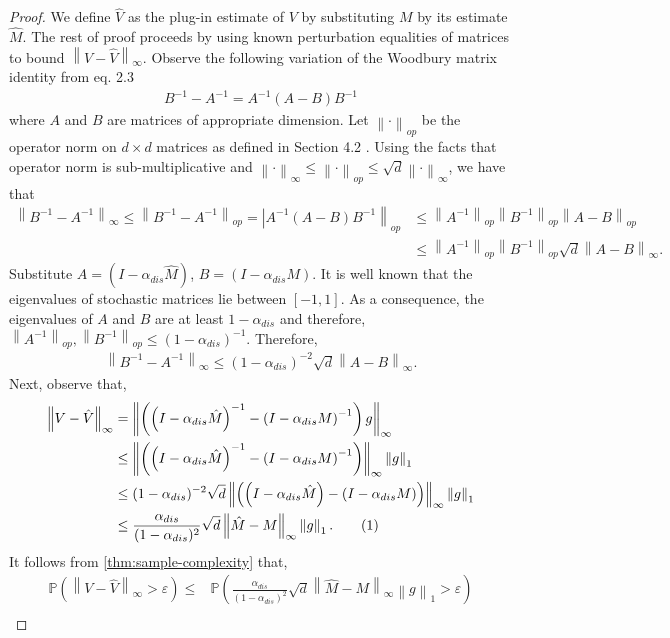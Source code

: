 \documentclass[opre,sglanonrev]{informs4}
\numberwithin{equation}{section}
\newcommand{\lp}{\left(}
\newcommand{\rp}{\right)}
\newcommand{\lv}{\left|}
\newcommand{\lV}{\left\|}
\newcommand{\rV}{\right\|}
\newcommand{\Pbb}{\mathbb{P}}
\newcommand\numberthis{\addtocounter{equation}{1}\tag{\theequation}}
\newcommand{\prob}{\Pbb}
\newcommand{\eps}{\varepsilon}
\begin{document}
\begin{APPENDICES}
\begin{proof}
We define $\hat V$ as the plug-in estimate of $V$ by substituting $M$ by its estimate $\hat M$.
The rest of proof proceeds by using known perturbation equalities of matrices to bound $\lV V-\hat V\rV_{\infty}$. Observe the following variation of the Woodbury matrix identity from eq. 2.3 \cite{wei2005note}
\begin{align*}
    B^{-1}-A^{-1} = A^{-1}(A-B)B^{-1}
\end{align*}
where $A$ and $B$ are matrices of appropriate dimension.
Let $\lV \cdot \rV_{op}$ be the operator norm on $d\times d$ matrices as defined in Section 4.2 \cite{zhang2011matrix}. 
Using the facts that operator norm is sub-multiplicative and $\lV \cdot \rV_{\infty}\leq \lV \cdot \rV_{op}\leq \sqrt{d}\lV \cdot \rV_{\infty}$, we have that
\begin{align*}
    \lV B^{-1}-A^{-1} \rV_{\infty}\leq \lV B^{-1}-A^{-1} \rV_{op} =  \lv A^{-1}(A-B)B^{-1}\rV_{op} & \leq \lV A^{-1} \rV_{op}\lV B^{-1} \rV_{op}\lV A-B \rV_{op}\\
    & \leq \lV A^{-1} \rV_{op}\lV B^{-1} \rV_{op}\sqrt{d}\lV A-B \rV_{\infty}.
\end{align*}
Substitute $A=\lp I -  \alpha_{dis} \hat M\rp$, $B=\lp I -  \alpha_{dis} M\rp$.
It is well known that the eigenvalues of stochastic matrices lie between $[-1,1]$. 
As a consequence, the eigenvalues of $A$ and $B$ are at least $1-\alpha_{dis}$ and therefore, $\lV A^{-1} \rV_{op}, \lV B^{-1} \rV_{op}\leq \lp 1-\alpha_{dis}\rp^{-1}$. Therefore,
\begin{align*}
    \lV B^{-1}-A^{-1} \rV_{\infty}\leq (1-\alpha_{dis})^{-2} \sqrt{d}\lV A-B \rV_{\infty}.
\end{align*}
Next, observe that, 
\begin{align*}
    \lV V-\hat V \rV_{\infty} & = \lV \lp\lp I -  \alpha_{dis} \hat M\rp^{-1}-\lp I -  \alpha_{dis} M\rp^{-1}\rp g\rV_{\infty}\\
    & \leq \lV \lp\lp I -  \alpha_{dis} \hat M\rp^{-1}-\lp I -  \alpha_{dis} M\rp^{-1}\rp \rV_{\infty}\lV g\rV_{1}\\
    &\leq (1-\alpha_{dis})^{-2}\sqrt{d}\lV \lp\lp I -  \alpha_{dis} \hat M\rp-\lp I -  \alpha_{dis} M\rp\rp \rV_{\infty}\lV g\rV_{1}\\ 
    & \leq \frac{\alpha_{dis}}{(1-\alpha_{dis})^2}\sqrt{d}\lV  \hat M - M \rV_{\infty}\lV g\rV_{1}.\numberthis~\label{eq:policy-cont}
\end{align*}
It follows from \cref{thm:sample-complexity} that,
\begin{align*}
    \prob\lp \lV V-\hat V \rV_{\infty} >\eps \rp\leq & \prob \lp \frac{\alpha_{dis}}{(1-\alpha_{dis})^2}\sqrt{d}\lV  \hat M - M \rV_{\infty}\lV g\rV_{1}>\eps \rp\\ 

\end{align*}
\end{proof}
\end{APPENDICES}
\end{document}
